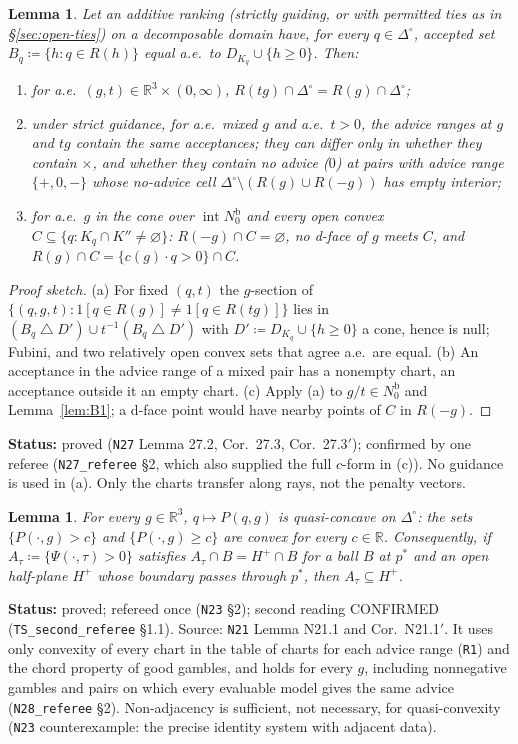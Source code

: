 \documentclass[11pt]{article}
\newtheorem{lemma}[theorem]{Lemma}
\theoremstyle{definition}
\theoremstyle{remark}
\newcommand{\R}{\mathbb R}
\newcommand{\Di}{\Delta^{\circ}}
\newcommand{\sd}{\mathbin{\triangle}}
\newcommand{\src}[1]{\texttt{#1}}
\newcommand{\status}[1]{\par\smallskip\noindent\textbf{Status:} #1\par\smallskip}
\newcommand{\Nb}{N_0^{\mathrm b}}
\begin{document}
\begin{lemma}\label{lem:raytransfer}
Let an additive ranking (strictly guiding, or with permitted ties as in \S\ref{sec:open-ties}) on a decomposable domain have, for every $q\in\Di$, accepted set $B_q\coloneqq\{h:q\in R(h)\}$ equal a.e.\ to $D_{K_q}\cup\{h\ge0\}$. Then:
\begin{enumerate}[leftmargin=*,label=(\alph*)]
\item for a.e.\ $(g,t)\in\R^3\times(0,\infty)$, $R(tg)\cap\Di=R(g)\cap\Di$;
\item under strict guidance, for a.e.\ mixed $g$ and a.e.\ $t>0$, the advice ranges at $g$ and $tg$ contain the same acceptances; they can differ only in whether they contain $\times$, and whether they contain no advice ($0$) at pairs with advice range $\{+,0,-\}$ whose no-advice cell $\Di\setminus(R(g)\cup R(-g))$ has empty interior;
\item for a.e.\ $g$ in the cone over $\operatorname{int}\Nb$ and every open convex $C\subseteq\{q:K_q\cap K''\ne\varnothing\}$: $R(-g)\cap C=\varnothing$, no d-face of $g$ meets $C$, and $R(g)\cap C=\{c(g)\cdot q>0\}\cap C$.
\end{enumerate}
\end{lemma}
\begin{proof}[Proof sketch]
(a) For fixed $(q,t)$ the $g$-section of $\{(q,g,t):1[q\in R(g)]\ne1[q\in R(tg)]\}$ lies in $(B_q\sd D')\cup t^{-1}(B_q\sd D')$ with $D'\coloneqq D_{K_q}\cup\{h\ge0\}$ a cone, hence is null; Fubini, and two relatively open convex sets that agree a.e.\ are equal. (b) An acceptance in the advice range of a mixed pair has a nonempty chart, an acceptance outside it an empty chart. (c) Apply (a) to $g/t\in\Nb$ and Lemma~\ref{lem:B1}; a d-face point would have nearby points of $C$ in $R(-g)$.
\end{proof}
\status{proved (\src{N27} Lemma 27.2, Cor.~27.3, Cor.~27.3$'$); confirmed by one referee (\src{N27\_referee} \S2, which also supplied the full $c$-form in (c)). No guidance is used in (a). Only the charts transfer along rays, not the penalty vectors.}

\begin{lemma}\label{lem:quasiconcave}
For every $g\in\R^3$, $q\mapsto P(q,g)$ is quasi-concave on $\Di$: the sets $\{P(\cdot,g)>c\}$ and $\{P(\cdot,g)\ge c\}$ are convex for every $c\in\R$. Consequently, if $A_\tau\coloneqq\{\Psi(\cdot,\tau)>0\}$ satisfies $A_\tau\cap B=H^+\cap B$ for a ball $B$ at $p^*$ and an open half-plane $H^+$ whose boundary passes through $p^*$, then $A_\tau\subseteq H^+$.
\end{lemma}
\status{proved; refereed once (\src{N23} \S2); second reading CONFIRMED (\src{TS\_second\_referee} \S1.1). Source: \src{N21} Lemma N21.1 and Cor.~N21.1$'$. It uses only convexity of every chart in the table of charts for each advice range (\src{R1}) and the chord property of good gambles, and holds for every $g$, including nonnegative gambles and pairs on which every evaluable model gives the same advice (\src{N28\_referee} \S2). Non-adjacency is sufficient, not necessary, for quasi-convexity (\src{N23} counterexample: the precise identity system with adjacent data).}
\end{document}
